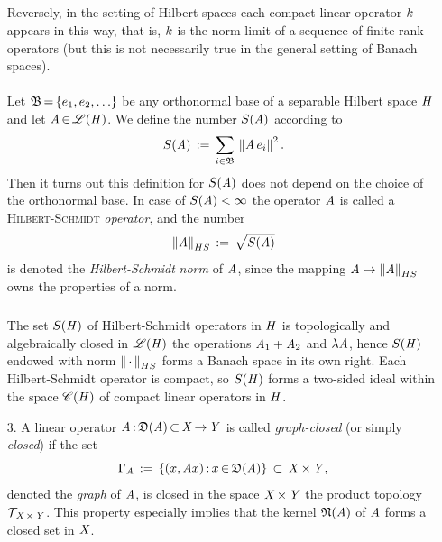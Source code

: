 \documentclass[11pt,twoside]{article}
\begin{document}
\begin{itemize}[leftmargin=12pt,itemsep=3pt]
\subparagraph{}
Reversely,
in the setting of Hilbert spaces 
each compact linear operator $\compA$ appears in this way,
that is,
$\compA$ is the norm-limit of a sequence of finite-rank operators
(but this is not necessarily true in the general setting of Banach spaces).

\paragraph{} %
Let $\basB \eq \{e_1,e_2,\ldots\}$ be any orthonormal base
of a separable Hilbert space $\hilH$ and let $\linA \xeof \BO{\hilH}$.
We define the number $S(\linA)$ according to
\[
S(\linA) \eqdef \sum_{i \in \basB} \, \norm{ \linA \, e_i}^2.
\]
Then it turns out this definition for $S(\linA)$
does not depend on the choice of the orthonormal base.
In case of $S(\linA) < \infty$
the operator $\linA$ is called a \textsc{Hilbert-Schmidt} \textit{operator},
and the number
\[
\norm{\linA}_{HS} \eqdef \sqrt{S(\linA)}
\]
is denoted the \textit{Hilbert-Schmidt} \textit{norm} of $\linA$,
since the mapping $\linA \mapsto \norm{\linA}_{HS} $
owns the properties of a norm.

\subparagraph{}
The set $\HS{\hilH}$ of {Hilbert-Schmidt} operators in $\hilH$
is topologically and algebraically closed in $\BO{\hilH}$
{\wrt} the operations $\linA_1 + \linA_2$ and $\lambda \linA$,
hence $\HS{\hilH}$ endowed with norm
$\norm{\,\cdot\,}_{HS}$ forms a Banach space in its own right.
Each {Hilbert-Schmidt} operator is compact,
so $\HS{\hilH}$ forms a two-sided ideal within the space $\CO{\hilH}$
of compact linear operators in $\hilH$.

\item[3.] %
A linear operator $\mathit{A} {\,:\,} \mathfrak{D}(\mathit{A}) {\,\subset\,} \mathit{X} {\,\to\,} \mathit{Y}$
is called \textit{graph-closed} (or simply \textit{closed}) if the set
\[
\Gamma_{\mathit{A}} \,:=\,
\{(x,\mathit{A} x) {\,:\,} x {\,\in\,} \mathfrak{D}(\mathit{A})\} \, \subset \, \mathit{X} {\,\times\,} \mathit{Y},
\]
denoted the \textit{graph} of $\linA$,
is closed in the space $\mathit{X} {\,\times\,} \mathit{Y}$
{\wrt} the product topology $\mathcal{T}_{\,\mathit{X} {\,\times\,} \mathit{Y}}$.
This property especially implies that
the kernel $\mathfrak{N}(\mathit{A})$ of $\linA$ forms a closed set in $\mathit{X}$.


\end{itemize}
\end{document}
